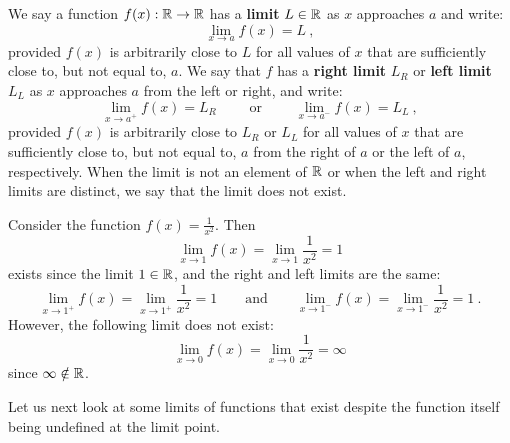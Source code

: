 \begin{definition}\label{D:LimitofRealFunction}
We say a function $f(x):\mathbb{R} \to \mathbb{R}$ has a {\bf limit} $L \in \mathbb{R}$ as $x$ approaches $a$ and write:
\[
\lim_{x \to a} f(x)=L \ ,
\]
provided $f(x)$ is arbitrarily close to $L$ for all values of $x$ that are sufficiently close to, but not equal to, $a$.  We say that $f$ has a {\bf right limit} $L_R$ or {\bf left limit} $L_L$ as $x$ approaches $a$ from the left or right, and write:
\[
\lim_{x \to a^+} f(x)=L_R  \qquad \text{ or } \qquad \lim_{x \to a^-} f(x)=L_L \ ,
\]
provided $f(x)$ is arbitrarily close to $L_R$ or $L_L$ for all values of $x$ that are sufficiently close to, but not equal to, $a$ from the right of $a$ or the left of $a$, respectively.  When the limit is not an element of $\mathbb{R}$ or when the left and right limits are distinct, we say that the limit does not exist.
\end{definition}

\begin{example}[Limit of $1/x^2$]
Consider the function $f(x)=\frac{1}{x^2}$.  Then
\[
\lim_{x \to 1} f(x) = \lim_{x \to 1} \frac{1}{x^2} = 1
\]
exists since the limit $1 \in \mathbb{R}$, and the right and left limits are the same:
\[
\lim_{x \to 1^+} f(x) = \lim_{x \to 1^+} \frac{1}{x^2} = 1 \qquad \text{and} \qquad
\lim_{x \to 1^-} f(x) = \lim_{x \to 1^-} \frac{1}{x^2} = 1 \ .
\]
However, the following limit does not exist:
\[
\lim_{x \to 0} f(x) = \lim_{x \to 0} \frac{1}{x^2} = \infty
\]
since $\infty \notin \mathbb{R}$.
\end{example}

Let us next look at some limits of functions that exist despite the function itself being undefined at the limit point.

